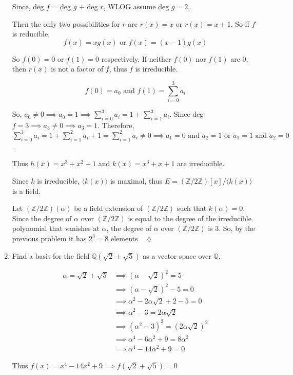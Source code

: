 \documentclass{article}
\newcommand\Z{\mathbb{Z}}
\newcommand\Q{\mathbb{Q}}
\begin{document}
\begin{enumerate}
  Since, deg $f$ = deg $g$ + deg $r$, WLOG assume  deg $g = 2$.

  Then the only two possibilities for $r$ are $r(x) = x$ or $r(x) = x+1$. So if $f$ is reducible, \[f(x)=
    xg(x) \text{ or } f(x) = (x-1)g(x)\]

  So $f(0)=0$ or $f(1) = 0$ respectively. If neither $f(0)$ nor $f(1)$
  are $0$, then $r(x)$ is not a factor of $f$, thus $f$ is
  irreducible.

  \[f(0) = a_0\text{ and } f(1) = \sum_{i=0}^3 a_i\]

  So, $a_0 \neq 0 \implies a_0 = 1\implies \sum_{i=0}^3a_i = 1
  +\sum_{i=1}^3 a_i$. Since deg $f =3 \implies a_3 \neq 0 \implies a_3
  = 1$. Therefore, $\sum_{i=0}^3a_i = 1
  +\sum_{i=1}^2 a_i + 1 = \sum_{i=1}^2 a_i \neq 0\implies a_1 = 0
  \text{ and }a_2 =1 \text{ or }a_1 = 1 \text{ and } a_2 = 0$.

  Thus $h(x) = x^3+x^2 +1$ and $k(x) = x^3 +x +1$ are irreducible.

  Since $k$ is irreducible, $\langle k(x) \rangle$ is maximal, thus $E
  = (\Z/2\Z)[x]/\langle k(x)\rangle$ is a field.

  Let $(\Z/2\Z)(\alpha)$ be a field extension  of $(\Z/2\Z)$ such that
  $k(\alpha)= 0$. Since the degree of $\alpha$ over $(\Z/2\Z)$ is
  equal to the degree of the irreducible polynomial that vanishes at
  $\alpha$, the degree of $\alpha$ over $(\Z/2\Z)$ is $3$. So, by the
  previous problem it has $2^3= 8$ elements$\quad \lozenge$
\newpage
\item Find a basis for the field $\Q(\sqrt 2 + \sqrt 5)$ as a vector space over $\Q$.


  \begin{align*}
    \alpha = \sqrt{2}+ \sqrt{5}
    &\implies (\alpha - \sqrt{2})^2 =
      5\\
    &\implies  (\alpha - \sqrt{2})^2 - 5 = 0\\
    &\implies  \alpha^2 -2 \alpha\sqrt{2} +2 - 5 = 0\\
    &\implies  \alpha^2  - 3 = 2 \alpha\sqrt{2}\\
    &\implies  (\alpha^2  - 3)^2 = (2 \alpha\sqrt{2})^2\\
    &\implies  \alpha^4-6\alpha^2 +9 = 8 \alpha^2\\
    &\implies  \alpha^4-14\alpha^2 +9 = 0
  \end{align*}

  Thus $f(x) = x^4-14x^2 +9 \implies f(\sqrt{2}+\sqrt{5}) = 0$


\end{enumerate}
\end{document}
